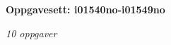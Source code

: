\centerline{\bf Oppgavesett: i01540no-i01549no}
\vskip 10pt
\centerline{\it 10 oppgaver}\vskip 10pt
\vskip 10pt
